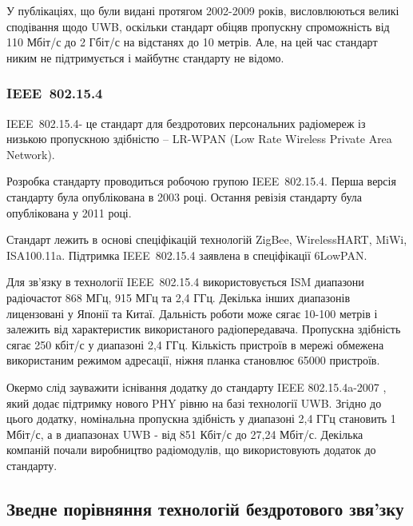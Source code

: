 \documentclass[a4paper,ukrainian,utf8,nocolumnsxix,floatsection]{eskdtext}
\renewcommand\paragraph{\subsubsection}
\newcommand{\todoi}[1]{\todo[inline]{#1}}
\newcommand{\iee}[0]{IEEE~802.15.4\xspace}
\newcommand{\engtxt}[1]{\foreignlanguage{english}{#1}}
\begin{document}
У публікаціях, що були видані протягом 2002-2009 років, висловлюються великі сподівання щодо UWB, оскільки стандарт обіцяв пропускну спроможність від 110 Мбіт/с до 2 Гбіт/с на відстанях до 10 метрів. Але, на цей час стандарт никим не підтримується і майбутнє стандарту не відомо.


\paragraph{\iee} %
\label{par:iee}

\iee - це стандарт для бездротових персональних радіомереж із низькою пропускною здібністю – LR-WPAN (\engtxt{Low Rate Wireless Private Area Network}). 

Розробка стандарту проводиться робочою групою \iee. Перша версія стандарту була опублікована в 2003 році. Остання ревізія стандарту була опублікована у 2011 році. 

Стандарт лежить в основі спеціфікацій технологій ZigBee, WirelessHART, MiWi, ISA100.11a. Підтримка \iee заявлена в спеціфікації 6LowPAN. 

Для зв’язку в технології \iee використовується ISM диапазони радіочастот 868 МГц, 915 МГц та 2,4 ГГц. Декілька інших диапазонів лицензовані у Японії та Китаї. Дальність роботи може сягає 10-100 метрів і залежить від характеристик використаного радіопередавача. Пропускна здібність сягає 250 кбіт/с у диапазоні 2,4 ГГц. Кількість пристроїв в мережі обмежена використаним режимом адресації, ніжня планка становлює 65000 пристроїв.

Окермо слід зауважити існівання додатку до стандарту IEEE 802.15.4a-2007 , який додає підтримку нового PHY рівню на базі технології UWB. Згідно до цього додатку, номінальна пропускна здібність у диапазоні 2,4 ГГц становить 1 Мбіт/с, а в диапазонах UWB - від 851 Кбіт/с до 27,24 Мбіт/с.  Декілька компаній почали виробництво радіомодулів, що використовують додаток до стандарту.



\todoi{інші технології?}

\subsection{Зведне порівняння технологій бездротового звя’зку}
\end{document}
